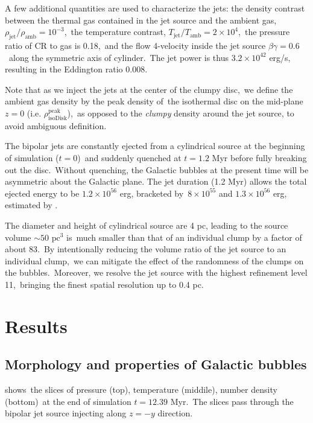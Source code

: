 \documentclass[twocolumn]{aastex631}
\begin{document}
  A few additional quantities are used to characterize the jets:
  the density contrast between the thermal gas contained in the jet source and the ambient gas,\
  $\rho_{\text{jet}}/\rho_{\text{amb}}=10^{-3}$,\
  the temperature contrast, $T_{\text{jet}}/T_{\text{amb}}=2\times10^{4}$,\
  the pressure ratio of CR to gas is 0.18,\
  and the flow 4-velocity inside the jet source $\beta\gamma = 0.6$\
  along the symmetric axis of cylinder.\
  The jet power is thus $3.2\times 10^{42}$ erg/s, resulting in the Eddington ratio 0.008.

  Note that as we inject the jets at the center of the clumpy disc,\
  we define the ambient gas density by the peak density of\
  the isothermal disc on the mid-plane $z=0$ (i.e. $\rho^{\text{peak}}_{\text{isoDisk}}$),\
  as opposed to the \textit{clumpy} density around the jet source, to avoid ambiguous definition.


  The bipolar jets are constantly ejected from a cylindrical source at the beginning of simulation ($t=0$)\
  and suddenly quenched at $t=1.2$ Myr before fully breaking out the disc.\
  Without quenching, the Galactic bubbles at the present time will be asymmetric about the Galactic plane.
  The jet duration (1.2 Myr) allows the total ejected energy to be $1.2\times10^{56}$ erg, bracketed by\
  $8\times10^{55}$ and $1.3\times10^{56}$ erg, estimated by \citet{Predehl2020}.\



  The diameter and height of cylindrical source are 4 pc, leading to the source volume $\sim 50 \text{ pc}^{3}$ is\
  much smaller than that of an individual clump by a factor of about 83.\
  By intentionally reducing the volume ratio of the jet source to an individual clump,\
  we can mitigate the effect of the randomness of the clumps on the bubbles.\
  Moreover, we resolve the jet source with the highest refinement level 11,\
  bringing the finest spatial resolution up to 0.4 pc.\



\section{Results}
\label{Results}

\subsection{Morphology and properties of Galactic bubbles}

  shows\
 the slices of pressure (top), temperature (middile), number density (bottom)\
 at the end of simulation $t=12.39$ Myr.\
 The slices pass through the bipolar jet source injecting along $z=-y$ direction.
\end{document}
